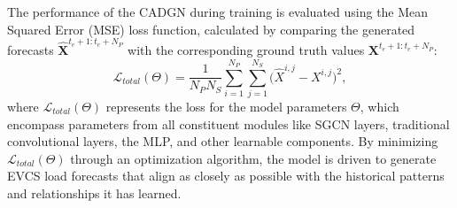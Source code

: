 \documentclass[lettersize,journal]{IEEEtran}
\begin{document}
The performance of the CADGN during training is evaluated using the Mean Squared Error (MSE) loss function, calculated by comparing the generated forecasts $\hat{\bm{X}}^{t_{e}+1: t_{e}+N_P}$ with the corresponding ground truth values  ${\bm{X}}^{t_{e}+1: t_{e}+N_P}$:
\begin{equation}
    \mathcal{L}_{total}(\Theta) =  \frac{1}{N_P N_S} \sum_{i=1}^{N_P} \sum_{j=1}^{N_S} \big(\hat{X}^{i,j} - {X}^{i,j}\big)^2,
    \label{eq:mse_loss}
\end{equation}
where $\mathcal{L}_{total}(\Theta)$ represents the loss for the model parameters $\Theta$, which encompass parameters from all constituent modules like SGCN layers, traditional convolutional layers, the MLP, and other learnable components. By minimizing $\mathcal{L}_{total}(\Theta)$  through an optimization algorithm, the model is driven to generate EVCS load forecasts that align as closely as possible with the historical patterns and relationships it has learned.





\end{document}
